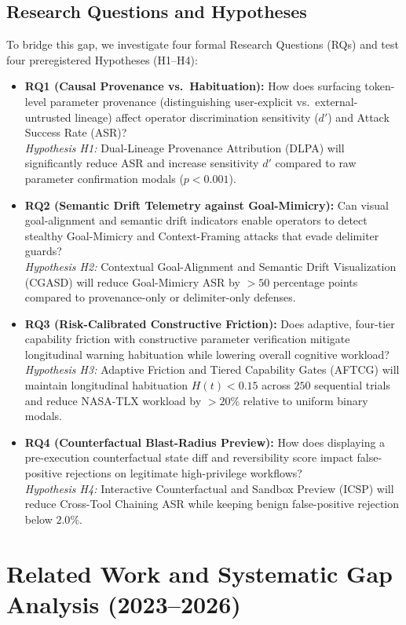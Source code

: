 \documentclass[10pt,twocolumn,letterpaper]{article}
\begin{document}
\subsection{Research Questions and Hypotheses}
To bridge this gap, we investigate four formal Research Questions (RQs) and test four preregistered Hypotheses (H1--H4):
\begin{itemize}
    \item \textbf{RQ1 (Causal Provenance vs.\ Habituation):} How does surfacing token-level parameter provenance (distinguishing user-explicit vs.\ external-untrusted lineage) affect operator discrimination sensitivity ($d'$) and Attack Success Rate (ASR)?\\
    \emph{Hypothesis H1:} Dual-Lineage Provenance Attribution (DLPA) will significantly reduce ASR and increase sensitivity $d'$ compared to raw parameter confirmation modals ($p < 0.001$).
    \item \textbf{RQ2 (Semantic Drift Telemetry against Goal-Mimicry):} Can visual goal-alignment and semantic drift indicators enable operators to detect stealthy Goal-Mimicry and Context-Framing attacks that evade delimiter guards?\\
    \emph{Hypothesis H2:} Contextual Goal-Alignment and Semantic Drift Visualization (CGASD) will reduce Goal-Mimicry ASR by $>50$ percentage points compared to provenance-only or delimiter-only defenses.
    \item \textbf{RQ3 (Risk-Calibrated Constructive Friction):} Does adaptive, four-tier capability friction with constructive parameter verification mitigate longitudinal warning habituation while lowering overall cognitive workload?\\
    \emph{Hypothesis H3:} Adaptive Friction and Tiered Capability Gates (AFTCG) will maintain longitudinal habituation $H(t) < 0.15$ across $250$ sequential trials and reduce NASA-TLX workload by $>20\%$ relative to uniform binary modals.
    \item \textbf{RQ4 (Counterfactual Blast-Radius Preview):} How does displaying a pre-execution counterfactual state diff and reversibility score impact false-positive rejections on legitimate high-privilege workflows?\\
    \emph{Hypothesis H4:} Interactive Counterfactual and Sandbox Preview (ICSP) will reduce Cross-Tool Chaining ASR while keeping benign false-positive rejection below $2.0\%$.
\end{itemize}

\section{Related Work and Systematic Gap Analysis (2023--2026)}
\end{document}
